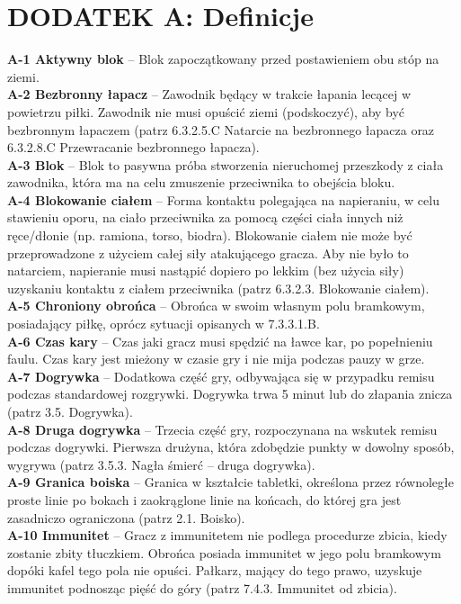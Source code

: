 \documentclass[11pt,a4paper]{article}
\newcommand{\psection}[1]{
  \section*{#1}
  \addcontentsline{toc}{section}{#1}
}
\begin{document}
\psection{DODATEK A: Definicje}
\textbf{A-1 Aktywny blok} – Blok zapoczątkowany przed postawieniem obu stóp na ziemi. \\
\textbf{A-2 Bezbronny łapacz} – Zawodnik będący w trakcie łapania lecącej w powietrzu piłki. Zawodnik nie musi opuścić ziemi (podskoczyć), aby być bezbronnym łapaczem (patrz 6.3.2.5.C Natarcie na bezbronnego łapacza oraz 6.3.2.8.C Przewracanie bezbronnego łapacza).\\
\textbf{A-3 Blok} – Blok to pasywna próba stworzenia nieruchomej przeszkody z ciała zawodnika, która ma na celu zmuszenie przeciwnika to obejścia bloku.\\
\textbf{A-4 Blokowanie ciałem} – Forma kontaktu polegająca na napieraniu, w celu stawieniu oporu, na ciało przeciwnika za pomocą części ciała innych niż ręce/dłonie (np. ramiona, torso, biodra). Blokowanie ciałem nie może być przeprowadzone z użyciem całej siły atakującego gracza. Aby nie było to natarciem, napieranie musi nastąpić dopiero po lekkim (bez użycia siły) uzyskaniu kontaktu z ciałem przeciwnika (patrz 6.3.2.3. Blokowanie ciałem).\\
\textbf{A-5 Chroniony obrońca} – Obrońca w swoim własnym polu bramkowym, posiadający piłkę, oprócz sytuacji opisanych w 7.3.3.1.B.\\
\textbf{A-6 Czas kary} – Czas jaki gracz musi spędzić na ławce kar, po popełnieniu faulu. Czas kary jest mieżony w czasie gry i nie mija podczas pauzy w grze.\\
\textbf{A-7 Dogrywka} – Dodatkowa część gry, odbywająca się w przypadku remisu podczas standardowej rozgrywki. Dogrywka trwa 5 minut lub do złapania znicza (patrz 3.5. Dogrywka).\\
\textbf{A-8 Druga dogrywka} – Trzecia część gry, rozpoczynana na wskutek remisu podczas dogrywki. Pierwsza drużyna, która zdobędzie punkty w dowolny sposób, wygrywa (patrz 3.5.3. Nagła śmierć – druga dogrywka).\\
\textbf{A-9 Granica boiska} – Granica w kształcie tabletki, określona przez równoległe proste linie po bokach i zaokrąglone linie na końcach, do której gra jest zasadniczo ograniczona (patrz 2.1. Boisko).\\
\textbf{A-10 Immunitet} – Gracz z immunitetem nie podlega procedurze zbicia, kiedy zostanie zbity tłuczkiem. Obrońca posiada immunitet w jego polu bramkowym dopóki kafel tego pola nie opuści. Pałkarz, mający do tego prawo, uzyskuje immunitet podnosząc pięść do góry (patrz 7.4.3. Immunitet od zbicia).\\
\end{document}
